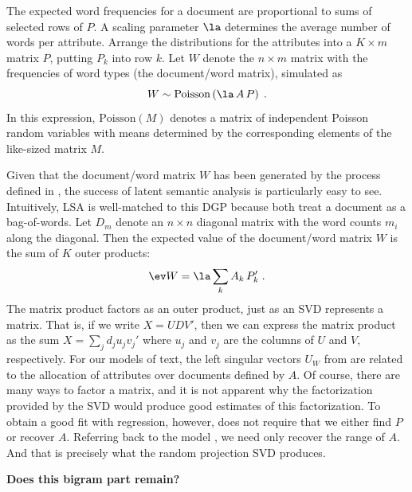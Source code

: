 \documentclass[12pt]{article}
\begin{document}
The expected word frequencies for a document are proportional to sums of selected rows of $P$.  A scaling parameter  $\la$ determines the average number of words per attribute.   Arrange the distributions for the attributes into a $K \times m$ matrix $P$, putting $P_k$ into row $k$.   Let $W$ denote the $n \times m$ matrix with the frequencies of word types (the document/word matrix), simulated as
\begin{equation}
	W \sim \mbox{Poisson} \left(\la \, A \, P \right) \;.
  \label{eq:simW}
\end{equation}
In this expression, $\mbox{Poisson}(M)$ denotes a matrix of independent Poisson random variables with means determined by the corresponding elements of the like-sized matrix $M$.

 
 Given that the document/word matrix $W$ has been  generated by the process defined in , the success of latent semantic analysis is particularly easy to see. Intuitively, LSA is well-matched to this DGP because both treat a document as a bag-of-words.  Let $D_m$ denote an $n \times n$ diagonal matrix with the  word counts $m_i$ along the diagonal.  Then the expected value of the document/word matrix $W$ is the sum of $K$ outer products:
\begin{equation}
    \ev W = \la \sum_k A_k \, P_k' \;.
  \label{eq:EW}
\end{equation}
The matrix product factors as an outer product, just as an SVD represents a matrix. That is, if we write $X = UDV'$, then we can express the matrix product as the sum $X = \sum_j d_{j} u_j v_j'$ where $u_j$ and $v_j$ are the columns of $U$ and $V$, respectively.  For our models of text, the left singular vectors $U_W$ from  are related to the allocation of attributes over documents defined by $A$.  Of course, there are many ways to factor a matrix, and it is not apparent why the factorization provided by the SVD would produce good estimates of this factorization.  To obtain a good fit with regression, however, does not require that we either find $P$ or recover $A$.  Referring back to the model , we need only recover the range of $A$.  And that is precisely what the random projection SVD produces.

\vspace{0.5in}

{\bf Does this bigram part remain? }
\end{document}
